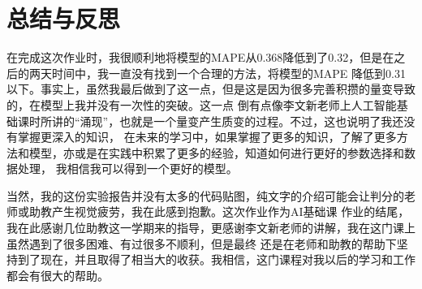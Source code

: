 \documentclass{ctexart}
\begin{document}
\section{总结与反思}
在完成这次作业时，我很顺利地将模型的MAPE从0.368降低到了0.32，但是在之后的两天时间中，我一直没有找到一个合理的方法，将模型的MAPE
降低到0.31以下。事实上，虽然我最后做到了这一点，但是这是因为很多完善积攒的量变导致的，在模型上我并没有一次性的突破。这一点
倒有点像李文新老师上人工智能基础课时所讲的“涌现”，也就是一个量变产生质变的过程。不过，这也说明了我还没有掌握更深入的知识，
在未来的学习中，如果掌握了更多的知识，了解了更多方法和模型，亦或是在实践中积累了更多的经验，知道如何进行更好的参数选择和数据处理，
我相信我可以得到一个更好的模型。\par
当然，我的这份实验报告并没有太多的代码贴图，纯文字的介绍可能会让判分的老师或助教产生视觉疲劳，我在此感到抱歉。这次作业作为AI基础课
作业的结尾，我在此感谢几位助教这一学期来的指导，更感谢李文新老师的讲解，我在这门课上虽然遇到了很多困难、有过很多不顺利，但是最终
还是在老师和助教的帮助下坚持到了现在，并且取得了相当大的收获。我相信，这门课程对我以后的学习和工作都会有很大的帮助。
\end{document}
